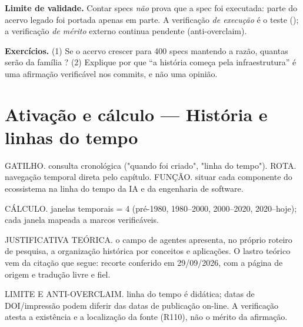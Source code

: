 \begin{aviso}
\textbf{Limite de validade.} Contar specs \emph{não} prova que a spec foi
executada: parte do acervo legado foi portada apenas em parte. A verificação
\emph{de execução} é o teste (); a verificação \emph{de
mérito} externo continua pendente (anti-overclaim).
\end{aviso}

\begin{resultado}
\textbf{Exercícios.} (1) Se o acervo crescer para 400 specs mantendo a razão,
quantas serão da família ? (2) Explique por que ``a história
começa pela infraestrutura'' é uma afirmação verificável nos commits, e não uma
opinião.
\end{resultado}

\section[Ativação e cálculo]{Ativação e cálculo — História e linhas do tempo}

\begin{processo}
GATILHO. consulta cronológica ("quando foi criado", "linha do tempo").
ROTA. navegação temporal direta pelo capítulo.
FUNÇÃO. situar cada componente do ecossistema na linha do tempo da IA e da engenharia de software.
\end{processo}

\begin{resultado}
CÁLCULO. janelas temporais = 4 (pré-1980, 1980--2000, 2000--2020, 2020--hoje); cada janela mapeada a marcos verificáveis.
\end{resultado}

\begin{descricao}
JUSTIFICATIVA TEÓRICA. o campo de agentes apresenta, no próprio roteiro de pesquisa, a organização histórica por conceitos e aplicações. O lastro teórico vem da citação que segue: recorte conferido em 29/09/2026, com a página de origem e tradução livre e fiel.
\end{descricao}

\begin{aviso}
LIMITE E ANTI-OVERCLAIM. linha do tempo é didática; datas de DOI/impressão podem diferir das datas de publicação on-line. A verificação atesta a existência e a
localização da fonte (R110), não o mérito da afirmação.
\end{aviso}

